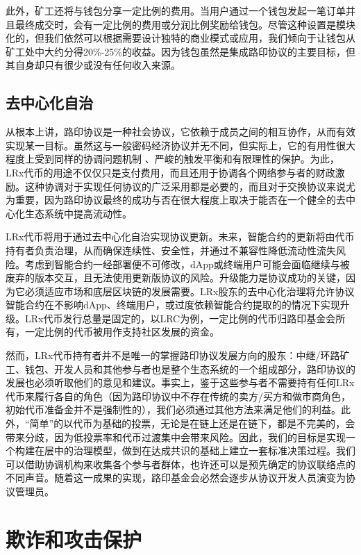 \documentclass[UTF8]{ctexart}
\begin{document}
\begin{multicols}{2}
此外，矿工还将与钱包分享一定比例的费用。当用户通过一个钱包发起一笔订单并且最终成交时，会有一定比例的费用或分润比例奖励给钱包。尽管这种设置是模块化的，但我们依然可以根据需要设计独特的商业模式或应用，我们倾向于让钱包从矿工处中大约分得20\%-25\%的收益。因为钱包虽然是集成路印协议的主要目标，但其自身却只有很少或没有任何收入来源。

\subsection{去中心化自治}
从根本上讲，路印协议是一种社会协议，它依赖于成员之间的相互协作，从而有效实现某一目标。虽然这与一般密码经济协议并无不同，但实际上，它的有用性很大程度上受到同样的协调问题机制 \cite{vitalikgovernance}、严峻的触发平衡和有限理性的保护。为此，LRx代币的用途不仅仅只是支付费用，而且还用于协调各个网络参与者的财政激励。这种协调对于实现任何协议的广泛采用都是必要的，而且对于交换协议来说尤为重要，因为路印协议最终的成功与否在很大程度上取决于能否在一个健全的去中心化生态系统中提高流动性。

LRx代币将用于通过去中心化自治实现协议更新。未来，智能合约的更新将由代币持有者负责治理，从而确保连续性、安全性，并通过不兼容性降低流动性流失风险。考虑到智能合约一经部署便不可修改，dApp或终端用户可能会面临继续与被废弃的版本交互，且无法使用更新版协议的风险。升级能力是协议成功的关键，因为它必须适应市场和底层区块链的发展需要。LRx股东的去中心化治理将允许协议智能合约在不影响dApp、终端用户，或过度依赖智能合约提取的的情况下实现升级。LRx代币发行总量是固定的，以LRC为例，一定比例的代币归路印基金会所有，一定比例的代币被用作支持社区发展的资金。

然而，LRx代币持有者并不是唯一的掌握路印协议发展方向的股东：中继/环路矿工、钱包、开发人员和其他参与者也是整个生态系统的一个组成部分，路印协议的发展也必须听取他们的意见和建议。事实上，鉴于这些参与者不需要持有任何LRx代币来履行各自的角色（因为路印协议中不存在传统的卖方/买方和做市商角色，初始代币准备金并不是强制性的），我们必须通过其他方法来满足他们的利益。此外，“简单”的以代币为基础的投票，无论是在链上还是在链下，都是不完美的，会带来分歧，因为低投票率和代币过渡集中会带来风险。因此，我们的目标是实现一个构建在层中的治理模型，做到在达成共识的基础上建立一套标准决策过程。我们可以借助协调机构来收集各个参与者群体，也许还可以是预先确定的协议联络点的不同声音。随着这一成果的实现，路印基金会必然会逐步从协议开发人员演变为协议管理员。

\section{欺诈和攻击保护}


\end{multicols}
\end{document}
